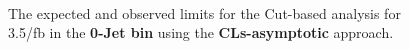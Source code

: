 \begin{figure}[!hbtp]
\centering
{} \\
\label{fig:uls_cut_0j}
\caption{The expected and observed limits for the Cut-based analysis for 3.5/fb in the {\bf 0-Jet bin} 
using the {\bf CLs-asymptotic} approach. }
\end{figure}


